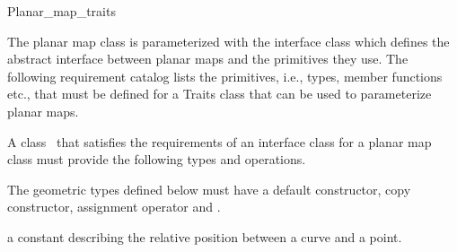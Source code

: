 
\ccRefPageBegin


\begin{ccRefConcept}{Planar_map_traits}
\label{PM_sec:req:interface} 
 

The planar map class is parameterized with the
interface class  which defines the abstract interface
between planar maps and the primitives they use. 
The following
requirement catalog lists the primitives, i.e., types, member functions
etc., that must be defined for a Traits class that can be used to
parameterize planar maps. %



\ccDefinition
    A class \ccClassTemplateName\ that satisfies the requirements of an
    interface class for a planar map class must provide the
    following types and operations. 

\ccTypes

    The geometric types defined below must have a default constructor,
    copy constructor, assignment operator and .
    
  
     {a constant describing the relative position between
       a curve and a point.}


    

\end{ccRefConcept}
